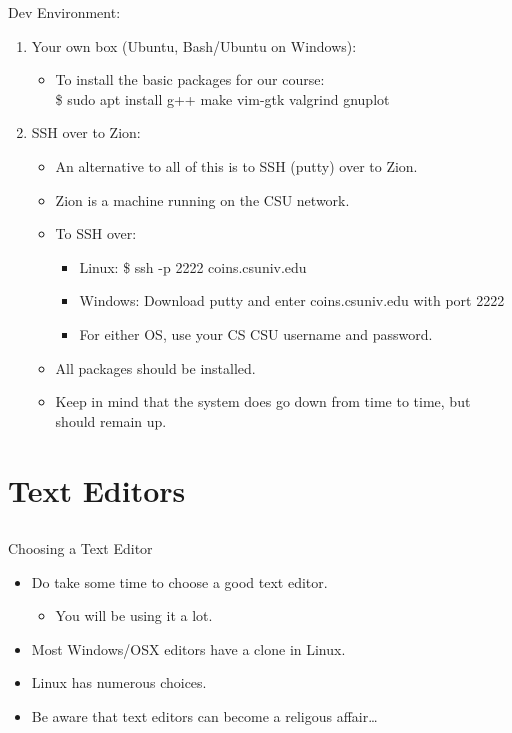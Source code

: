 \documentclass{beamer}
\begin{document}
\begin{frame}{Dev Environment:}
\begin{enumerate}
\item Your own box (Ubuntu, Bash/Ubuntu on Windows):
\begin{itemize}
\item To install the basic packages for our course:\\
\$ sudo apt install g++ make vim-gtk valgrind gnuplot
\end{itemize}
\item SSH over to Zion:
\begin{itemize}
\item An alternative to all of this is to SSH (putty) over to Zion.
\item Zion is a machine running on the CSU network.
\item To SSH over:
\begin{itemize}
\item Linux: \$ ssh -p 2222 coins.csuniv.edu
\item Windows: Download putty and enter coins.csuniv.edu with port 2222
\item For either OS, use your CS CSU username and password.
\end{itemize}
\item All packages should be installed.
\item Keep in mind that the system does go down from time to time, but should remain up.
\end{itemize}
\end{enumerate}
\end{frame}

\section{Text Editors}
\subsection{}

\begin{frame}{Choosing a Text Editor}
\begin{itemize}
\item Do take some time to choose a good text editor.
\begin{itemize}
\item You will be using it a lot.
\end{itemize}
\item Most Windows/OSX editors have a clone in Linux.
\item Linux has numerous choices.
\item Be aware that text editors can become a religous affair\ldots
\end{itemize}
\end{frame}
\end{document}
